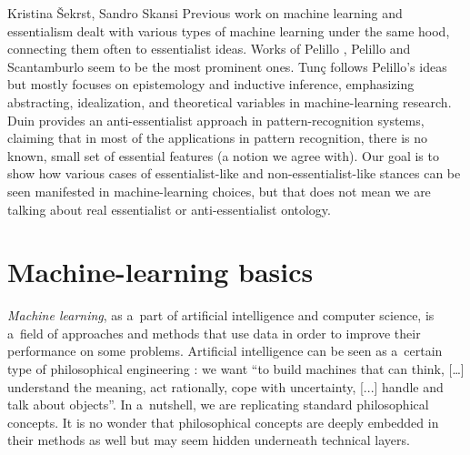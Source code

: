 \begin{artengenv2auth}{Kristina Šekrst, Sandro Skansi}
Previous work on machine learning and essentialism dealt with various types of machine learning under the same hood, connecting them often to essentialist ideas. Works of Pelillo
\parencite*[][]{pelillo_introduction_2013}, %
 Pelillo and Scantamburlo 
\parencite*[][]{hutchison_how_2013} %
 seem to be the most prominent ones. Tunç 
\parencite*[][]{tunc_semantics_2015} %
 follows Pelillo's 
\parencite*[][]{pelillo_introduction_2013} %
 ideas but mostly focuses on epistemology and inductive inference, emphasizing abstracting, idealization, and theoretical variables in machine-learning research. Duin 
\parencite*[][]{duin_dissimilarity_2015} %
 provides an anti-essentialist approach in pattern-recognition systems, claiming that in most of the applications in pattern recognition, there is no known, small set of essential features (a notion we agree with). Our goal is to show how various cases of essentialist-like and non-essentialist-like stances can be seen manifested in machine-learning choices, but that does not mean we are talking about real essentialist or anti-essentialist ontology.

\section{Machine-learning basics}
\textit{Machine learning}, as a~part of artificial intelligence and computer science, is a~field of approaches and methods that use data in order to improve their performance on some problems. Artificial intelligence can be seen as a~certain type of philosophical engineering
\parencite[][p.vii]{skansi_introduction_2018}: %
 we want ``to build machines that can think, […] understand the meaning, act rationally, cope with uncertainty, [...] handle and talk about objects''. In a~nutshell, we are replicating standard philosophical concepts. It is no wonder that philosophical concepts are deeply embedded in their methods as well but may seem hidden underneath technical layers.


\end{artengenv2auth}
